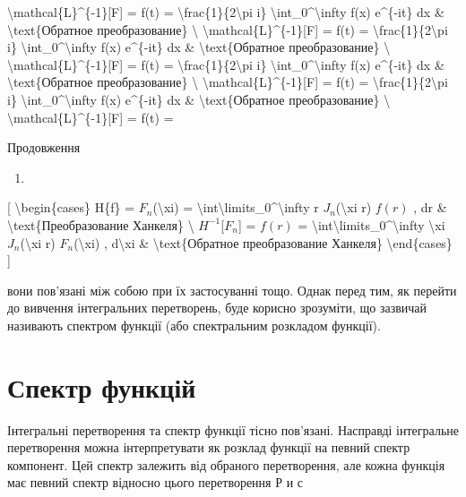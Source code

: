 \documentclass[
]{article}
\providecommand{\tightlist}{%
  \setlength{\itemsep}{0pt}\setlength{\parskip}{0pt}}
\begin{document}
{{\begin{enumerate}
  \textbackslash mathcal\{L\}\^{}\{-1\}{[}F{]} = f(t) =
  \textbackslash frac\{1\}\{2\textbackslash pi i\}
  \textbackslash int\_0\^{}\textbackslash infty f(x) e\^{}\{-it\} dx \&
  \textbackslash text\{Обратное преобразование\} \textbackslash{}
  \textbackslash mathcal\{L\}\^{}\{-1\}{[}F{]} = f(t) =
  \textbackslash frac\{1\}\{2\textbackslash pi i\}
  \textbackslash int\_0\^{}\textbackslash infty f(x) e\^{}\{-it\} dx \&
  \textbackslash text\{Обратное преобразование\} \textbackslash{}
  \textbackslash mathcal\{L\}\^{}\{-1\}{[}F{]} = f(t) =
  \textbackslash frac\{1\}\{2\textbackslash pi i\}
  \textbackslash int\_0\^{}\textbackslash infty f(x) e\^{}\{-it\} dx \&
  \textbackslash text\{Обратное преобразование\} \textbackslash{}
  \textbackslash mathcal\{L\}\^{}\{-1\}{[}F{]} = f(t) =
  \textbackslash frac\{1\}\{2\textbackslash pi i\}
  \textbackslash int\_0\^{}\textbackslash infty f(x) e\^{}\{-it\} dx \&
  \textbackslash text\{Обратное преобразование\} \textbackslash{}
  \textbackslash mathcal\{L\}\^{}\{-1\}{[}F{]} = f(t) =
\end{enumerate}

Продовження

\begin{enumerate}
\def\labelenumi{\arabic{enumi}.}
\setcounter{enumi}{6}
\tightlist
\item
\end{enumerate}

{[} \textbackslash begin\{cases\} H\{f\} = \(F_n\)(\textbackslash xi) =
\textbackslash int\textbackslash limits\_0\^{}\textbackslash infty r
\(J_n\)(\textbackslash xi r) \(f(r)\) , dr \&
\textbackslash text\{Преобразование Ханкеля\} \textbackslash{}
\(H^{-1}\){[}\(F_n\){]} = \(f(r)\) =
\textbackslash int\textbackslash limits\_0\^{}\textbackslash infty
\textbackslash xi \(J_n\)(\textbackslash xi r)
\(F_n\)(\textbackslash xi) , d\textbackslash xi \&
\textbackslash text\{Обратное преобразование Ханкеля\}
\textbackslash end\{cases\} {]}

вони пов'язані між собою при їх застосуванні тощо. Однак перед тим, як
перейти до вивчення інтегральних перетворень, буде корисно зрозуміти, що
зазвичай називають спектром функції (або спектральним розкладом
функції).

\section{Спектр
функцій}\label{ux441ux43fux435ux43aux442ux440-ux444ux443ux43dux43aux446ux456ux439}

Інтегральні перетворення та спектр функції тісно пов'язані. Насправді
інтегральне перетворення можна інтерпретувати як розклад функції на
певний спектр компонент. Цей спектр залежить від обраного перетворення,
але кожна функція має певний спектр відносно цього перетворення Р и с

}}
\end{document}
